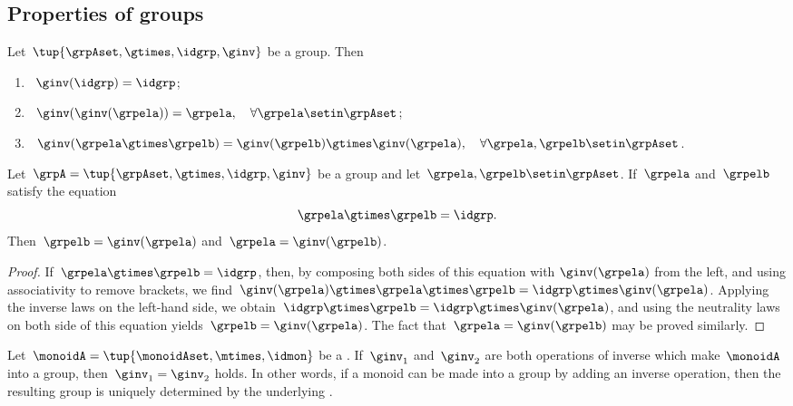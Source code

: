 
\subsection{Properties of groups}

\begin{lemma}
    \label{lem:inv-op-properties}
    Let~$\tup{\grpAset, \gtimes, \idgrp, \ginv}$ be a group.
    Then
    \begin{enumerate}
        \item\label{eq:group-neutral-invariant}~$\ginv(\idgrp) = \idgrp$;
        \item\label{eq:group-inverse-inverse}~$ \ginv(\ginv(\grpela)) = \grpela, \quad \forall \grpela \setin \grpAset$;
        \item\label{eq:group-inverse-of-composition}~$\ginv(\grpela \gtimes \grpelb ) = \ginv(\grpelb) \gtimes \ginv(\grpela), \quad \forall \grpela, \grpelb \setin \grpAset$.
    \end{enumerate}
\end{lemma}

\begin{lemma}
    \label{lem:inv-op-unique}
    Let~$\grpA = \tup{ \grpAset, \gtimes, \idgrp, \ginv }$ be a group and let~$\grpela, \grpelb \setin \grpAset$.
    If~$\grpela$ and~$\grpelb$ satisfy the equation
    \begin{equation}
        \grpela \gtimes \grpelb = \idgrp.
    \end{equation}
    Then~$\grpelb = \ginv( \grpela )$ and~$\grpela = \ginv(\grpelb)$.
\end{lemma}

\begin{proof}
    If~$\grpela \gtimes \grpelb = \idgrp$, then, by composing both sides of this equation with $\ginv(\grpela)$ from the left, and using associativity to remove brackets, we find~$\ginv(\grpela) \gtimes \grpela \gtimes \grpelb = \idgrp \gtimes \ginv(\grpela)$.
    Applying the inverse laws on the left-hand side, we obtain~$\idgrp \gtimes \grpelb = \idgrp \gtimes \ginv(\grpela)$, and using the neutrality laws on both side of this equation yields~$\grpelb =  \ginv(\grpela)$.
    The fact that~$\grpela = \ginv(\grpelb)$ may be proved similarly.
\end{proof}

\begin{corollary}
    \label{cor:inv-op-unique}
    Let~$\monoidA = \tup{\monoidAset, \mtimes,  \idmon }$ be a .
    If~$\ginv_1$ and~$\ginv_2$ are both operations of inverse which make~$\monoidA$ into a group, then~$\ginv_1 =\ginv_2$ holds.
    In other words, if a monoid can be made into a group by adding an inverse operation, then the resulting group is uniquely determined by the underlying .
\end{corollary}


